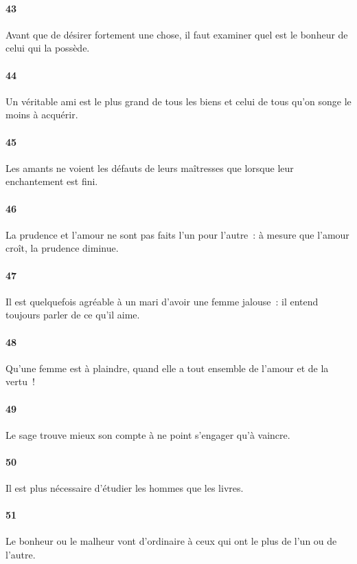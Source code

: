 \documentclass[french,twoside]{book} %
\begin{document}
\paragraph[{43}]{ \textsc{43} }
\noindent Avant que de désirer fortement une chose, il faut examiner quel est le bonheur de celui qui la possède.
\paragraph[{44}]{ \textsc{44} }
\noindent Un véritable ami est le plus grand de tous les biens et celui de tous qu’on songe le moins à acquérir.
\paragraph[{45}]{ \textsc{45} }
\noindent Les amants ne voient les défauts de leurs maîtresses que lorsque leur enchantement est fini.
\paragraph[{46}]{ \textsc{46} }
\noindent La prudence et l’amour ne sont pas faits l’un pour l’autre : à mesure que l’amour croît, la prudence diminue.
\paragraph[{47}]{ \textsc{47} }
\noindent Il est quelquefois agréable à un mari d’avoir une femme jalouse : il entend toujours parler de ce qu’il aime.
\paragraph[{48}]{ \textsc{48} }
\noindent Qu’une femme est à plaindre, quand elle a tout ensemble de l’amour et de la vertu !
\paragraph[{49}]{ \textsc{49} }
\noindent Le sage trouve mieux son compte à ne point s’engager qu’à vaincre.
\paragraph[{50}]{ \textsc{50} }
\noindent Il est plus nécessaire d’étudier les hommes que les livres.
\paragraph[{51}]{ \textsc{51} }
\noindent Le bonheur ou le malheur vont d’ordinaire à ceux qui ont le plus de l’un ou de l’autre.
\end{document}
